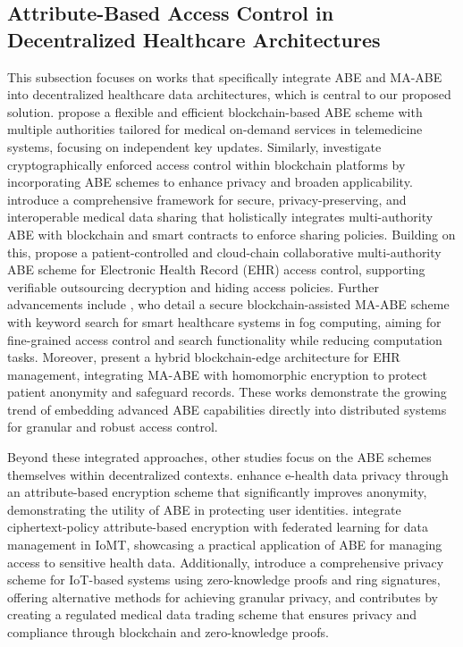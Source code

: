 \documentclass[cic,tc,english]{iiufrgs}
\numberwithin{algorithm}{chapter}
\begin{document}
        \subsection{Attribute-Based Access Control in Decentralized Healthcare Architectures}
            This subsection focuses on works that specifically integrate ABE and MA-ABE into decentralized healthcare data architectures, which is central to our proposed solution. \citet{Guo2019Flexible} propose a flexible and efficient blockchain-based ABE scheme with multiple authorities tailored for medical on-demand services in telemedicine systems, focusing on independent key updates. Similarly, \citet{Ghaffaripour2019Cryptographically} investigate cryptographically enforced access control within blockchain platforms by incorporating ABE schemes to enhance privacy and broaden applicability. \citet{Jin2019Secure} introduce a comprehensive framework for secure, privacy-preserving, and interoperable medical data sharing that holistically integrates multi-authority ABE with blockchain and smart contracts to enforce sharing policies. Building on this, \citet{Yang2022Blockchain} propose a patient-controlled and cloud-chain collaborative multi-authority ABE scheme for Electronic Health Record (EHR) access control, supporting verifiable outsourcing decryption and hiding access policies. Further advancements include \citet{Li2023Secure}, who detail a secure blockchain-assisted MA-ABE scheme with keyword search for smart healthcare systems in fog computing, aiming for fine-grained access control and search functionality while reducing computation tasks. Moreover, \citet{Guo2023Hybrid} present a hybrid blockchain-edge architecture for EHR management, integrating MA-ABE with homomorphic encryption to protect patient anonymity and safeguard records. These works demonstrate the growing trend of embedding advanced ABE capabilities directly into distributed systems for granular and robust access control.

            Beyond these integrated approaches, other studies focus on the ABE schemes themselves within decentralized contexts. \citet{Zala2024} enhance e-health data privacy through an attribute-based encryption scheme that significantly improves anonymity, demonstrating the utility of ABE in protecting user identities. \citet{Bhansali2022} integrate ciphertext-policy attribute-based encryption with federated learning for data management in IoMT, showcasing a practical application of ABE for managing access to sensitive health data. Additionally, \citet{Esfahani2024} introduce a comprehensive privacy scheme for IoT-based systems using zero-knowledge proofs and ring signatures, offering alternative methods for achieving granular privacy, and \citet{Li2024} contributes by creating a regulated medical data trading scheme that ensures privacy and compliance through blockchain and zero-knowledge proofs.
\end{document}
